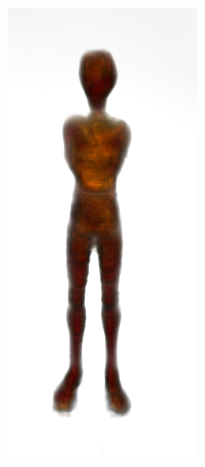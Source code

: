 \begin{figure}[ht]
\begin{subfigure}[b]{0.12\textwidth}
        \includegraphics[width=\textwidth]{etc/bias/bias_poor_dreamfusion_part1.png}

\end{subfigure}
\end{figure}
